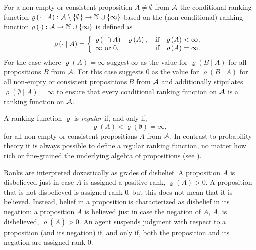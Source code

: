 For a non-empty or consistent proposition $A\neq\emptyset$ from $\cal A$ the conditional ranking function $\varrho\left(\cdot\mid A\right):\begin{cal}A\end{cal}\setminus\left\{\emptyset\right\}\rightarrow\mathbb{N}\cup\left\{\infty\right\}$ based on the (non-conditional) ranking function $\varrho\left(\cdot\right):\begin{cal}A\end{cal}\rightarrow\mathbb{N}\cup\left\{\infty\right\}$ is defined as
\[\varrho\left(\cdot\mid A\right)=\left\{\begin{array}{l}\varrho\left(\cdot\cap A\right)-\varrho\left(A\right),\quad\mbox{if}\quad\varrho\left(A\right)<\infty,\\
\infty\mbox{ or }0,\hfill\mbox{if}\quad\varrho\left(A\right)=\infty.\end{array}\right.\]
For the case where $\varrho\left(A\right)=\infty$ \citet[63]{gj96} suggest $\infty$ as the value for $\varrho\left(B\mid A\right)$ for all propositions $B$ from $\cal A$. For this case \citet[464]{h06} suggests $0$ as the value for $\varrho\left(B\mid A\right)$ for all non-empty or consistent propositions $B$ from $\cal A$ and additionally stipulates $\varrho\left(\emptyset\mid A\right)=\infty$ to ensure that every conditional ranking function on $\cal A$ is a ranking function on $\cal A$. %

A ranking function $\varrho$ is \emph{regular} if, and only if,
$$\varrho\left(A\right)<\varrho\left(\emptyset\right)=\infty,$$
for all non-empty or consistent propositions $A$ from $\cal A$. In contrast to probability theory it is always possible to define a regular ranking function, no matter how rich or fine-grained the underlying algebra of propositions (see \citealp{hun}).

Ranks are interpreted doxastically as grades of disbelief. A proposition $A$ is disbelieved just in case $A$ is assigned a positive rank, $\varrho\left(A\right)>0$. A proposition that is not disbelieved is assigned rank $0$, but this does not mean that it is believed. Instead, belief in a proposition is characterized as disbelief in its negation: a proposition $A$ is believed just in case the negation of $A$, $\overline{A}$, is disbelieved, $\varrho\left(\overline{A}\right)>0$. An agent suspends judgment with respect to a proposition (and its negation) if, and only if, both the proposition and its negation are assigned rank $0$.

